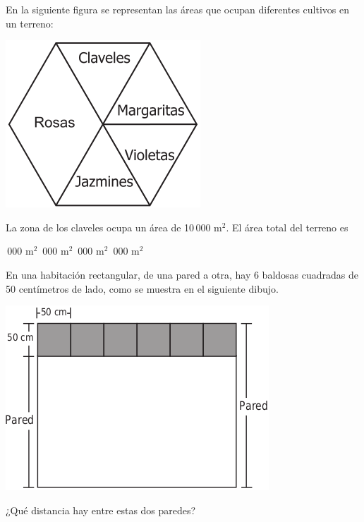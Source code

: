 \documentclass[10pt,letterpaper,addpoints]{exam}
\begin{document}
\begin{multicols}{2}
\begin{questions}
\begin{oneparchoices}
\end{oneparchoices}
\question En la siguiente figura se representan las áreas que ocupan diferentes cultivos en un terreno:
\begin{center}
\includegraphics[scale=.45]{Images/claveles.png} 
\end{center}
La zona de los claveles ocupa un área de 10\,000 m$^{2}$. El área total del terreno es
\begin{multicols}{2}
\begin{choices}
\,000 m$^{2}$
\,000 m$^{2}$
\,000 m$^{2}$
\,000 m$^{2}$
\end{choices}
\end{multicols}
\question En una habitación rectangular, de una pared a otra, hay 6 baldosas cuadradas de 50 centímetros de lado, como se muestra en el siguiente dibujo.
\begin{center}
\includegraphics[scale=.5]{Images/habitacion.png} 
\end{center}
¿Qué distancia hay entre estas dos paredes?
\begin{multicols}{2}
\begin{choices}

\end{choices}
\end{multicols}
\end{questions}
\end{multicols}
\end{document}
